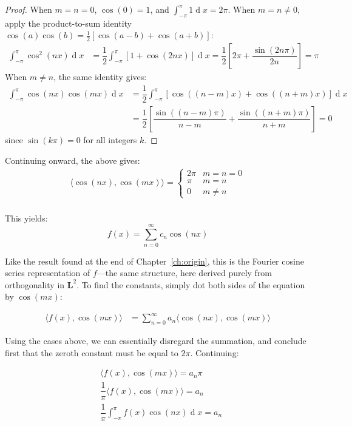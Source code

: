 \documentclass[12pt,a4paper]{report}
\DeclareMathOperator{\deriv}{d}
\theoremstyle{thms}
\theoremstyle{defns}
\begin{document}
\begin{proof}
    When $m = n = 0$, $\cos(0) = 1$, and $\int_{-\pi}^{\pi} 1\deriv{x} = 2\pi$. When $m = n \neq 0$, apply the product-to-sum identity $\cos(a)\cos(b) = \frac{1}{2}[\cos(a - b) + \cos(a + b)]$:
    \begin{align}
        \int_{-\pi}^{\pi} \cos^2(nx)\deriv{x} &= \dfrac{1}{2}\int_{-\pi}^{\pi}[1 + \cos(2nx)]\deriv{x} = \dfrac{1}{2}\left[2\pi + \dfrac{\sin(2n\pi)}{2n}\right] = \pi
    \end{align}
    When $m \neq n$, the same identity gives:
    \begin{align}
        \int_{-\pi}^{\pi}\cos(nx)\cos(mx)\deriv{x} &= \dfrac{1}{2}\int_{-\pi}^{\pi}[\cos((n-m)x) + \cos((n+m)x)]\deriv{x} \\
        &= \dfrac{1}{2}\left[\dfrac{\sin((n-m)\pi)}{n-m} + \dfrac{\sin((n+m)\pi)}{n+m}\right] = 0
    \end{align}
    since $\sin(k\pi) = 0$ for all integers $k$.
\end{proof}

Continuing onward, the above gives:
\begin{align}
    \langle \cos(nx), \cos(mx) \rangle = \begin{cases}
        2\pi & m = n = 0 \\
        \pi  & m = n     \\
        0    & m \neq n
    \end{cases} \\
\end{align}


This yields:
\begin{equation}
    f(x) = \sum_{n=0}^{\infty}c_n\cos(nx)
\end{equation}

Like the result found at the end of Chapter~\ref{ch:origin}, this is the Fourier cosine series representation of $f$—the same structure, here derived purely from orthogonality in $\mathbf{L}^2$. To find the constants, simply dot both sides of the equation by $\cos(mx)$:

\begin{align}
    \langle f(x), \cos(mx) \rangle & = \sum_{n=0}^{\infty}a_n \langle \cos(nx), \cos(mx) \rangle
\end{align}

Using the cases above, we can essentially disregard the summation, and conclude first that the zeroth constant must be equal to $2\pi$. Continuing:

\begin{align}
     & \langle f(x), \cos(mx) \rangle = a_n\pi                      \\
     & \dfrac{1}{\pi}\langle f(x), \cos(mx) \rangle = a_n           \\
     & \dfrac{1}{\pi}\int_{-\pi}^{\pi} f(x)\cos(nx) \deriv{x} = a_n
\end{align}
\end{document}
